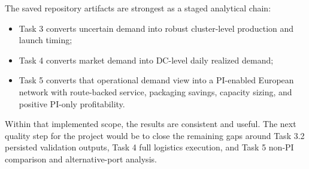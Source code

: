 \documentclass[11pt]{article}
\begin{document}
The saved repository artifacts are strongest as a staged analytical chain:
\begin{itemize}
  \item Task 3 converts uncertain demand into robust cluster-level production and launch timing;
  \item Task 4 converts market demand into DC-level daily realized demand;
  \item Task 5 converts that operational demand view into a PI-enabled European network with
  route-backed service, packaging savings, capacity sizing, and positive PI-only profitability.
\end{itemize}

Within that implemented scope, the results are consistent and useful. The next quality step for
the project would be to close the remaining gaps around Task 3.2 persisted validation outputs,
Task 4 full logistics execution, and Task 5 non-PI comparison and alternative-port analysis.
\end{document}
